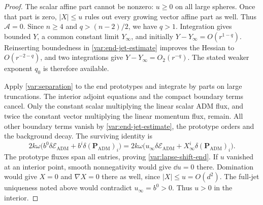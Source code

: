 \begin{proof}
The scalar affine part cannot be nonzero: $u\ge0$ on all
large spheres.  Once that part is zero, $|X|\le u$ rules
out every growing vector affine part as well.  Thus
$\mathcal A=0$.  Since $n\ge4$ and $q>(n-2)/2$, we have
$q>1$.  Integration gives bounded $Y$, a common constant
limit $Y_\infty$, and initially $Y-Y_\infty=O(r^{1-q})$.
Reinserting boundedness in \eqref{var:end-jet-estimate}
improves the Hessian to $O(r^{-2-q})$, and two integrations
give $Y-Y_\infty=O_2(r^{-q})$.  The stated weaker exponent
$q_0$ is therefore available.

Apply \eqref{var:separation} to the end prototypes and
integrate by parts on large truncations.  The interior
adjoint equations and the compact boundary terms cancel.
Only the constant scalar multiplying the linear scalar
ADM flux, and twice the constant vector multiplying the
linear momentum flux, remain.  All other boundary terms
vanish by \eqref{var:end-jet-estimate}, the prototype
orders and the background decay.  The surviving identity
is
\begin{equation}
 2k\omega\bigl(b^0\delta\mathcal E_{\mathrm{ADM}}
                     +b^i\delta(\mathbf P_{\mathrm{ADM}})_i\bigr)
 =2k\omega\bigl(u_\infty\delta\mathcal E_{\mathrm{ADM}}
                     +X_\infty^i\delta(\mathbf P_{\mathrm{ADM}})_i\bigr).
 \label{var:prototype-normalization}
\end{equation}
The prototype fluxes span all entries, proving
\eqref{var:lapse-shift-end}.  If $u$ vanished at an
interior point, smooth nonnegativity would give
$\dd u=0$ there.  Domination would give $X=0$ and
$\nabla X=0$ there as well, since $|X|\le u=O(d^2)$.
The full-jet uniqueness noted above would contradict
$u_\infty=b^0>0$.  Thus $u>0$ in the interior.


\end{proof}
